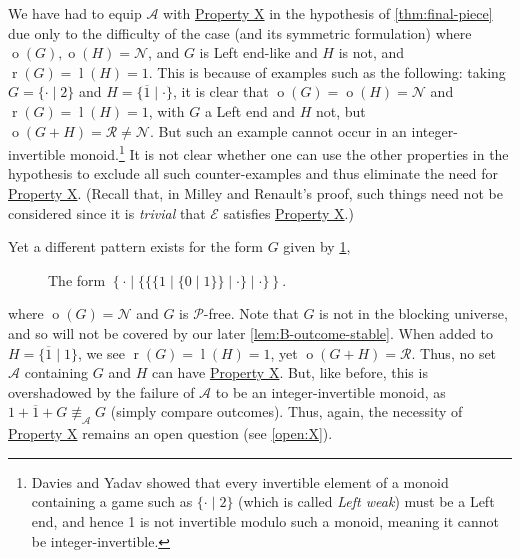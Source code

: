 \documentclass[11pt]{article}
\theoremstyle{definition}
\DeclareMathOperator{\outcome}{o}
\newcommand{\set}[1]{\mathcal{#1}}
\DeclareMathOperator{\ltp}{l}
\DeclareMathOperator{\rtp}{r}
\begin{document}
We have had to equip $\set{A}$ with \hyperlink{prop:X}{Property X} in the
hypothesis of \cref{thm:final-piece} due only to the difficulty of the case
(and its symmetric formulation) where $\outcome(G),\outcome(H)=\mathscr{N}$,
and $G$ is Left end-like and $H$ is not, and $\rtp(G)=\ltp(H)=1$. This is
because of examples such as the following: taking $G=\{\cdot\mid2\}$ and
$H=\{\overline{1}\mid\cdot\}$, it is clear that
$\outcome(G)=\outcome(H)=\mathscr{N}$ and $\rtp(G)=\ltp(H)=1$, with $G$ a Left
end and $H$ not, but $\outcome(G+H)=\mathscr{R}\neq\mathscr{N}$. But such an
example cannot occur in an integer-invertible monoid.\footnote{Davies and Yadav
    showed \cite[Theorem 5.9 on p.~23]{davies.yadav:invertibility} that every
    invertible element of a monoid containing a game such as $\{\cdot\mid2\}$
    (which is called \emph{Left weak}) must be a Left end, and hence 1 is not
    invertible modulo such a monoid, meaning it cannot be integer-invertible.
}
It is not clear whether one can use the other properties in the hypothesis to
exclude all such counter-examples and thus eliminate the need for
\hyperlink{prop:X}{Property X}. (Recall that, in Milley and Renault's proof,
such things need not be considered since it is \emph{trivial} that $\set{E}$
satisfies \hyperlink{prop:X}{Property X}.)

Yet a different pattern exists for the form $G$ given by
\cref{fig:strange-form},
\begin{figure}
    \centering
    \caption{
        The form
        $\left\{\cdot\mid\{\{\{1\mid\{0\mid1\}\}\mid\cdot\}\mid\cdot\}\right\}$.
    }
    \label{fig:strange-form}
\end{figure}
where $\outcome(G)=\mathscr{N}$ and $G$ is $\mathscr{P}$-free. Note that $G$ is
not in the blocking universe, and so will not be covered by our later
\cref{lem:B-outcome-stable}. When added to $H=\{\overline{1}\mid1\}$, we see
$\rtp(G)=\ltp(H)=1$, yet $\outcome(G+H)=\mathscr{R}$. Thus, no set $\set{A}$
containing $G$ and $H$ can have \hyperlink{prop:X}{Property X}. But, like
before, this is overshadowed by the failure of $\set{A}$ to be an
integer-invertible monoid, as $1+\overline{1}+G\not\equiv_\set{A}G$ (simply
compare outcomes). Thus, again, the necessity of \hyperlink{prop:X}{Property X}
remains an open question (see \cref{open:X}).
\end{document}
